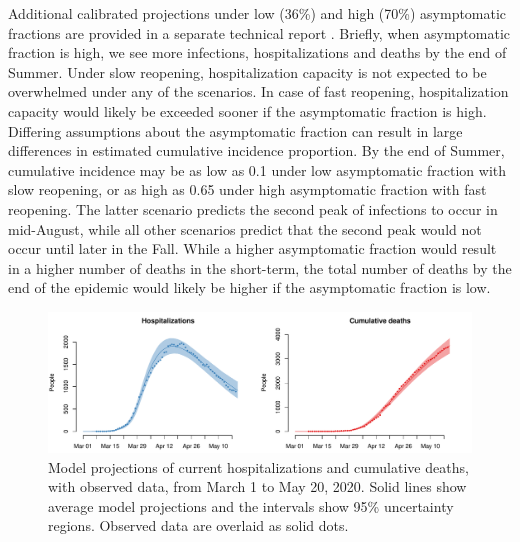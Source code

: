 \documentclass[11pt]{article}
\begin{document}
Additional calibrated projections under low (36\%) and high (70\%) asymptomatic fractions are provided in a separate technical report \citep{morozova2020tech}.  Briefly, when asymptomatic fraction is high, we see more infections, hospitalizations and deaths by the end of Summer.  Under slow reopening, hospitalization capacity is not expected to be overwhelmed under any of the scenarios.  In case of fast reopening, hospitalization capacity would likely be exceeded sooner if the asymptomatic fraction is high. Differing assumptions about the asymptomatic fraction can result in large differences in estimated cumulative incidence proportion.  By the end of Summer, cumulative incidence may be as low as 0.1 under low asymptomatic fraction with slow reopening, or as high as 0.65 under high asymptomatic fraction with fast reopening. The latter scenario predicts the second peak of infections to occur in mid-August, while all other scenarios predict that the second peak would not occur until later in the Fall. While a higher asymptomatic fraction would result in a higher number of deaths in the short-term, the total number of deaths by the end of the epidemic would likely be higher if the asymptomatic fraction is low. 

\begin{figure}
\centering
\includegraphics[width=\textwidth]{figures/calibration.pdf}
\caption{Model projections of current hospitalizations and cumulative deaths, with observed data, from March 1 to May 20, 2020. Solid lines show average model projections and the intervals show 95\% uncertainty regions.  Observed data are overlaid as solid dots.} 
\label{fig:calibration}
\end{figure}
\end{document}
